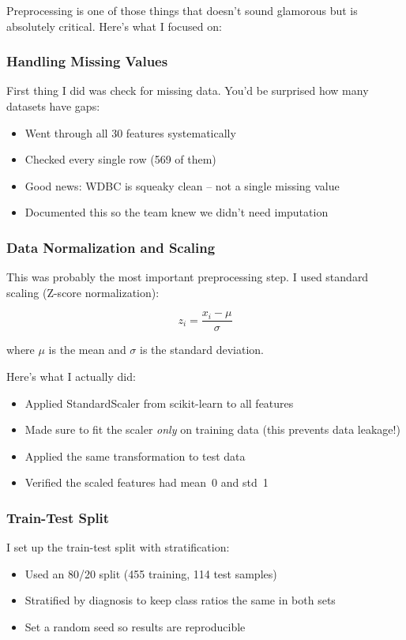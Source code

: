 \documentclass[12pt]{article}
\begin{document}
Preprocessing is one of those things that doesn't sound glamorous but is absolutely critical. Here's what I focused on:

\subsubsection{Handling Missing Values}
First thing I did was check for missing data. You'd be surprised how many datasets have gaps:
\begin{itemize}
    \item Went through all 30 features systematically
    \item Checked every single row (569 of them)
    \item Good news: WDBC is squeaky clean -- not a single missing value
    \item Documented this so the team knew we didn't need imputation
\end{itemize}

\subsubsection{Data Normalization and Scaling}
This was probably the most important preprocessing step. I used standard scaling (Z-score normalization):

\begin{equation}
z_i = \frac{x_i - \mu}{\sigma}
\end{equation}

where $\mu$ is the mean and $\sigma$ is the standard deviation.

Here's what I actually did:
\begin{itemize}
    \item Applied StandardScaler from scikit-learn to all features
    \item Made sure to fit the scaler \textit{only} on training data (this prevents data leakage!)
    \item Applied the same transformation to test data
    \item Verified the scaled features had mean~0 and std~1
\end{itemize}

\subsubsection{Train-Test Split}
I set up the train-test split with stratification:
\begin{itemize}
    \item Used an 80/20 split (455 training, 114 test samples)
    \item Stratified by diagnosis to keep class ratios the same in both sets
    \item Set a random seed so results are reproducible
\end{itemize}
\end{document}
